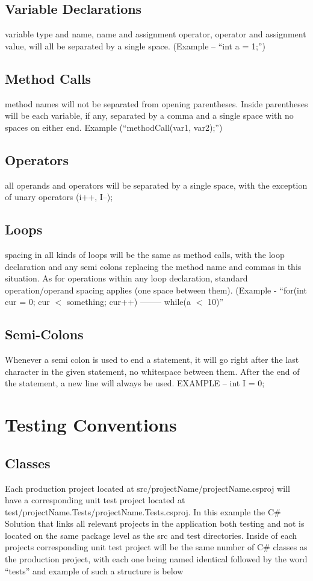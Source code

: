 \documentclass{article}
\begin{document}
\subsection{Variable Declarations}
variable type and name, name and assignment operator, operator and assignment value, will all be separated by a single space. (Example – \enquote{int a = 1;})
\subsection{Method Calls}
method names will not be separated from opening parentheses. Inside parentheses will be each variable, if any, separated by a comma and a single space with no spaces on either end. Example (\enquote{methodCall(var1, var2);})
\subsection{Operators}
all operands and operators will be separated by a single space, with the exception of unary operators (i++, I--);
\subsection{Loops}
spacing in all kinds of loops will be the same as method calls, with the loop declaration and any semi colons replacing the method name and commas in this situation. As for operations within any loop declaration, standard operation/operand spacing applies (one space between them). 
\newline (Example - \enquote{for(int cur = 0; cur $<$ something; cur++) -------- while(a $<$ 10)}

\subsection{Semi-Colons}
Whenever a semi colon is used to end a statement, it will go right after the last character in the given statement, no whitespace between them. After the end of the statement, a new line will always be used. \newline  EXAMPLE – int I = 0;

\section{Testing Conventions}
\subsection{Classes}
Each production project located at src/projectName/projectName.csproj will have a corresponding unit test project located at test/projectName.Tests/projectName.Tests.csproj. In this example the C$\#$ Solution that links all relevant projects in the application both testing and not is located on the same package level as the src and test directories. Inside of each projects corresponding unit test project will be the same number of C$\#$ classes as the production project, with each one being named identical followed by the word “tests” and example of such a structure is below \newline 
\end{document}

